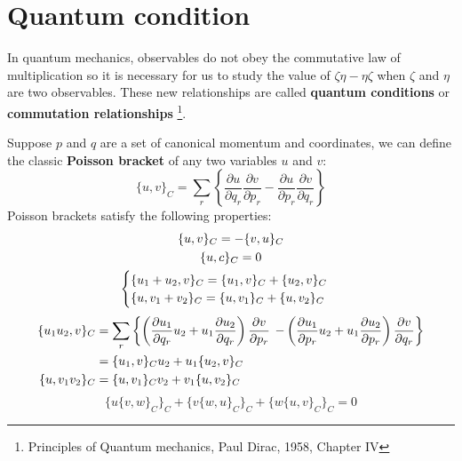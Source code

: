 \documentclass{article}
\begin{document}
\section{Quantum condition}
In quantum mechanics, observables do not obey the commutative law of multiplication so
it is necessary for us to study the value of $\zeta\eta - \eta\zeta$ when $\zeta$ and $\eta$
are two observables. These new relationships are called \textbf{quantum conditions} or
\textbf{commutation relationships} 
\footnote{Principles of Quantum mechanics, Paul Dirac, 1958, Chapter IV}.

Suppose $p$ and $q$ are a set of canonical momentum and coordinates, we can define the classic
\textbf{Poisson bracket} of any two variables $u$ and $v$:
\begin{equation}
    \{ u,v \}_C = \sum_r \left\{ \frac{\partial u}{\partial q_r}\frac{\partial v}{\partial p_r} - \frac{\partial u}{\partial p_r}\frac{\partial v}{\partial q_r} \right\}
\end{equation}
Poisson brackets satisfy the following properties:
\begin{gather}
    \{u,v\}_C = - \{v,u\}_C \\
    \{u,c\}_C = 0 \\
    \begin{cases}
        \{ u_1 + u_2, v\}_C = \{ u_1, v\}_C + \{u_2,v\}_C \notag \\
        \{ u, v_1 + v_2\}_C = \{ u, v_1\}_C + \{u,v_2\}_C 
    \end{cases}
\end{gather}
\begin{align}
    \{u_1u_2,v\}_C 
    &= \sum_r \left\{ \left( \frac{\partial u_1}{\partial q_r} u_2 + u_1\frac{\partial u_2}{\partial q_r}\right)\frac{\partial v}{\partial p_r} \right. 
                \left.- \left( \frac{\partial u_1}{\partial p_r} u_2 + u_1\frac{\partial u_2}{\partial p_r}\right)\frac{\partial v}{\partial q_r} \right\} \notag \\
    &= \{u_1,v\}_C u_2 + u_1 \{ u_2,v \}_C \notag \\
    \{u,v_1v_2\}_C &= \{u,v_1\}_C v_2 + v_1 \{ u,v_2 \}_C
\end{align}
\begin{equation}
    \{u \{v,w\}_C\}_C + \{v \{w,u\}_C\}_C + \{w \{u,v\}_C\}_C = 0
\end{equation}
\end{document}
